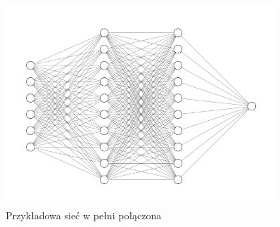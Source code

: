 \documentclass{myclass}
\numberwithin{equation}{subsection}
\begin{document}
\begin{figure}[ht]
\centering
\includegraphics[width=0.9\textwidth]{figs/fcn.png}
\caption{Przykładowa sieć w pełni połączona}
\label{fig:fcn}
\end{figure}
\end{document}
